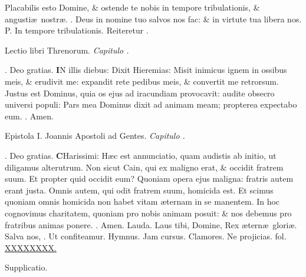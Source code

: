 \documentclass[letter,11pt]{book}
\makeatletter
\DeclareRobustCommand{\Vbar}{\vers@resp{-0.1em}{V}}
\DeclareRobustCommand{\Rbar}{\vers@resp{0pt}{R}}
\newcommand{\vers@resp@sym}{\raisebox{0.2ex}{\rotatebox[origin=c]{-20}{$\m@th\rceil$}}}
\newcommand{\vers@resp}[2]{%
  {\ooalign{\hidewidth\kern#1\vers@resp@sym\hidewidth\cr#2\cr}}%
}%
\def\P{\color{Red} P. \color{black}}
\def\V{\color{Red} \Vbar . \color{black}}
\def\R{\color{Red} \Rbar . \color{black}}
\makeatother
\begin{document}
\begin{multicols*}{2}
\par \noindent Placabilis esto Domine, \& ostende te nobis in tempore tribulationis, \& angusti\ae \ nostr\ae . \V Deus in nomine tuo salvos nos fac: \& in virtute tua libera nos. \P In tempore tribulationis. \color{Red} Reiteretur \color{black} \R
\vspace{-.5em} \begin{center} {\color{Red} L}ectio libri Threnorum. \itshape Capitulo . \end{center} \vspace{-.5em}
\par \noindent \R Deo gratias.
\lettrine[lines=2]{\bfseries \color{Red} I}{}N illis diebus: Dixit Hieremias: Misit inimicus ignem in ossibus meis, \& erudivit me: expandit rete pedibus meis, \& convertit me retrorsum. Justus est Dominus, quia os ejus ad iracundiam provocavit: audite obsecro universi populi: Pars mea Dominus dixit ad animam meam; propterea expectabo eum. \R Amen.
\vspace{-.5em} \begin{center} {\color{Red} E}pistola I. Joannis Apostoli ad Gentes. \itshape Capitulo . \end{center} \vspace{-.5em}
\par \noindent \R Deo gratias.
\lettrine[lines=2]{\bfseries \color{Red} C}{}Harissimi: H\ae c est annunciatio, quam audistis ab initio, ut diligamus alterutrum. Non sicut Cain, qui ex maligno erat, \& occidit fratrem suum. Et propter quid occidit eum? Quoniam opera ejus maligna: fratris autem erant justa. Omnis autem, qui odit fratrem suum, homicida est. Et scimus quoniam omnis homicida non habet vitam \ae ternam in se manentem. In hoc cognovimus charitatem, quoniam pro nobis animam posuit: \& nos debemus pro fratribus animas ponere. \R Amen.
\newline \color{Red} Lauda. \color{black} Laus tibi, Domine, Rex \ae tern\ae \ glori\ae . Salva nos, \V Ut confiteamur.
\newline \color{Red} Hymnus. \color{black} Jam cursus.
\newline \color{Red} Clamores. \color{black} Ne projicias. \color{Red} fol. \color{black} \hyperlink{}{XXXXXXXX.}
\vspace{-.5em} \begin{center} \color{Red} Supplicatio. \end{center} \vspace{-.5em}

\end{multicols*}
\end{document}
